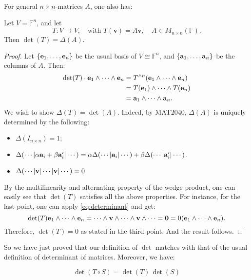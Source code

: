 For general $n \times n$-matrices $A$, one also has:
\begin{theorem}\label{thm:det_linear_operator_matrix}
Let \( V = \mathbb{F}^n \), and let
\[
T : V \to V, \quad \text{with } T(\mathbf{v}) = A \mathbf{v}, \quad A \in M_{n \times n}(\mathbb{F}).
\]
Then \(\det(T) = \Delta(A).\)
\end{theorem}
\begin{proof}
Let \( \{ {\bf e}_1, \dots, {\bf e}_n \} \) be the usual basis of \( V \cong \mathbb{F}^n \), and  \( \{ {\bf a}_1, \dots, {\bf a}_n \} \) be the columns of $A$. Then:
\begin{equation} \label{eq:determinant}
\begin{aligned}
\det(T) \cdot {\bf e}_1 \wedge \cdots \wedge {\bf e}_n
  &= T^{\wedge n}({\bf e}_1 \wedge \cdots \wedge {\bf e}_n) \\
  &= T({\bf e}_1) \wedge \cdots \wedge T({\bf e}_n) \\
  &= {\bf a}_1 \wedge \cdots \wedge {\bf a}_n.
\end{aligned}
\end{equation}
We wish to show $\Delta(T) = \det(A)$. Indeed, by MAT2040, $\Delta(A)$ is uniquely determined by the following:
\begin{itemize}
    \item $\Delta(I_{n \times n}) = 1$;
    \item $\Delta( \cdots | \alpha{\bf a}_i + \beta {\bf a}_i'| \cdots) = \alpha\Delta( \cdots | {\bf a}_i| \cdots) + \beta\Delta( \cdots | {\bf a}_i'| \cdots)$.
    \item $\Delta( \cdots | {\bf v}| \cdots| {\bf v}| \cdots) = 0$
\end{itemize}
By the multilinearity and alternating property of the wedge product, one can easily see that $\det(T)$ satisfies all the above properties. For instance, for the last point, one can apply \autoref{eq:determinant} and get:
\[
\det(T) {\bf e}_1 \wedge \cdots \wedge {\bf e}_n = \cdots \wedge {\bf v} \wedge \cdots \wedge {\bf v} \wedge \cdots = {\bf 0} = 0({\bf e}_1 \wedge \cdots \wedge {\bf e}_n).
\]
Therefore, \(\det(T) = 0\) as stated in the third point. And the result follows.
\end{proof}

So we have just proved that our definition of $\det$ matches with that of the usual definition of determinant of matrices. Moreover, we have:
\begin{corollary}
\label{cor:det-composition}
\[
\det(T \circ S) = \det(T)\, \det(S)
\]
\end{corollary}

